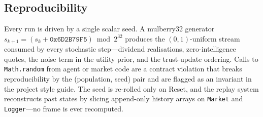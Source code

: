 \subsection{Reproducibility}

Every run is driven by a single scalar seed. A mulberry32 generator
$s_{k+1}=(s_k+\mathtt{0x6D2B79F5})\bmod 2^{32}$ produces the
$(0,1)$-uniform stream consumed by every stochastic step---dividend
realisations, zero-intelligence quotes, the noise term in the
utility prior, and the trust-update ordering. Calls to
\texttt{Math.random} from agent or market code are a contract
violation that breaks reproducibility by the (population, seed)
pair and are flagged as an invariant in the project style guide.
The seed is re-rolled only on Reset, and the replay system
reconstructs past states by slicing append-only history arrays on
\texttt{Market} and \texttt{Logger}---no frame is ever recomputed.
